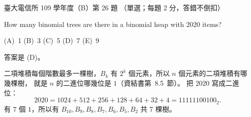 \begin{pastexam}[label={px:ntu-109-comm-dsa-26}]{臺大電信所 109 學年度（B）第 26 題}
（單選；每題 2 分，答錯不倒扣）

How many binomial trees are there in a binomial heap with 2020 items?

(A)~1 \qquad (B)~3 \qquad (C)~5 \qquad (D)~7 \qquad (E)~9
\end{pastexam}

\begin{pastsoln}
答案是 (D)。

二項堆積每個階數最多一棵樹，$B_k$ 有 $2^k$ 個元素，所以 $n$ 個元素的二項堆積有哪幾棵樹，
就是 $n$ 的二進位哪幾位是 $1$（資結書第~8.5~節）。 把 $2020$ 寫成二進位：
\[
2020 = 1024 + 512 + 256 + 128 + 64 + 32 + 4 = 11111100100_2 .
\]
有 $7$ 個 $1$，所以有 $B_{10}, B_9, B_8, B_7, B_6, B_5, B_2$ 共 $7$ 棵樹。
\end{pastsoln}
